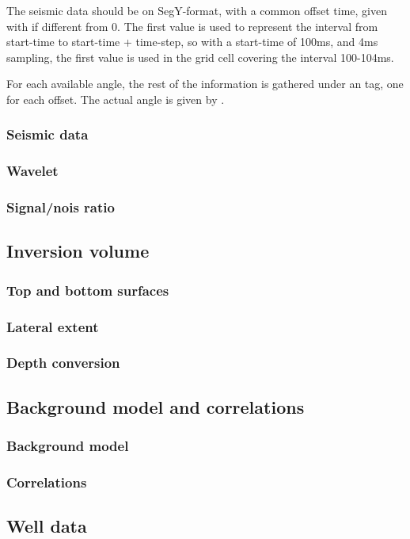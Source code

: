 The seismic data should be on SegY-format, with a common offset time, given with  if different from 0. The first value is used to represent the interval from start-time to start-time + time-step, so with a start-time of 100ms, and 4ms sampling, the first value is used in the grid cell covering the interval 100-104ms. 

For each available angle, the rest of the information is gathered under an  tag, one for each offset. The actual angle is given by .
\subsubsection{Seismic data}
\subsubsection{Wavelet}
\subsubsection{Signal/nois ratio}
\subsection{Inversion volume}
\subsubsection{Top and bottom surfaces}
\subsubsection{Lateral extent}
\subsubsection{Depth conversion}
\subsection{Background model and correlations}
\subsubsection{Background model}
\subsubsection{Correlations}
\subsection{Well data}

